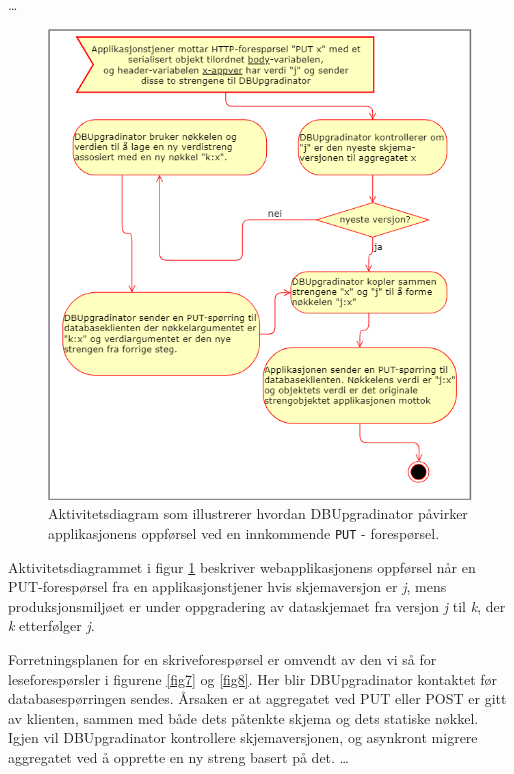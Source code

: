 \ldots

\newpage

\begin{figure}[hbtp]
    \centering
    \includegraphics[scale=0.5]{fig/dbupgradinator-prosess-3.png}
    \caption{Aktivitetsdiagram som illustrerer hvordan DBUpgradinator påvirker applikasjonens oppførsel ved en innkommende \texttt{PUT} - forespørsel.}
    \label{fig9}
\end{figure}

Aktivitetsdiagrammet i figur \ref{fig9} beskriver webapplikasjonens oppførsel når en PUT-forespørsel fra en applikasjonstjener hvis skjemaversjon er \emph{j}, mens produksjonsmiljøet er under oppgradering av dataskjemaet fra versjon \emph{j} til \emph{k}, der \emph{k} etterfølger \emph{j}.

Forretningsplanen for en skriveforespørsel er omvendt av den vi så for leseforespørsler i figurene \ref{fig7} og \ref{fig8}. Her blir DBUpgradinator kontaktet før databasespørringen sendes. Årsaken er at aggregatet ved PUT eller POST er gitt av klienten, sammen med både dets påtenkte skjema og dets statiske nøkkel. Igjen vil DBUpgradinator kontrollere skjemaversjonen, og asynkront migrere aggregatet ved å opprette en ny streng basert på det. \ldots

